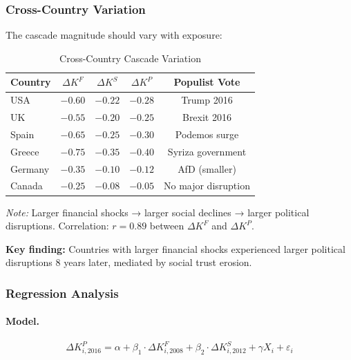 \subsubsection{Cross-Country Variation}

The cascade magnitude should vary with exposure:

\begin{table}[htbp]
\centering
\caption{Cross-Country Cascade Variation}
\label{tab:cross-country}
\small
\begin{tabular}{@{}lcccc@{}}
\toprule
\textbf{Country} & \textbf{$\Delta K^F$} & \textbf{$\Delta K^S$} & \textbf{$\Delta K^P$} & \textbf{Populist Vote} \\
\midrule
USA & $-0.60$ & $-0.22$ & $-0.28$ & Trump 2016 \\
UK & $-0.55$ & $-0.20$ & $-0.25$ & Brexit 2016 \\
Spain & $-0.65$ & $-0.25$ & $-0.30$ & Podemos surge \\
Greece & $-0.75$ & $-0.35$ & $-0.40$ & Syriza government \\
Germany & $-0.35$ & $-0.10$ & $-0.12$ & AfD (smaller) \\
Canada & $-0.25$ & $-0.08$ & $-0.05$ & No major disruption \\
\bottomrule
\end{tabular}
\begin{flushleft}
\small\textit{Note:} Larger financial shocks → larger social declines → larger political disruptions. Correlation: $r = 0.89$ between $\Delta K^F$ and $\Delta K^P$.
\end{flushleft}
\end{table}

\textbf{Key finding:} Countries with larger financial shocks experienced larger 
political disruptions 8 years later, mediated by social trust erosion.

\subsubsection{Regression Analysis}

\paragraph{Model.}
\begin{equation}
\Delta K^P_{i,2016} = \alpha + \beta_1 \cdot \Delta K^F_{i,2008} + \beta_2 \cdot \Delta K^S_{i,2012} + \gamma X_i + \varepsilon_i
\end{equation}

